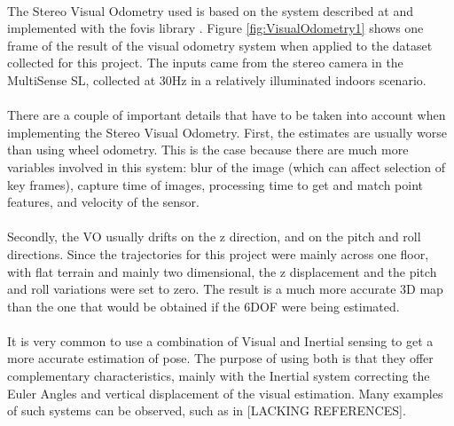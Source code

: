 \documentclass[12pt]{article}
\begin{document}
	\paragraph{}
	The Stereo Visual Odometry used is based on the system described at \cite{VisualOdometry} and implemented with the fovis library \cite{fovis}. Figure \ref{fig:VisualOdometry1} shows one frame of the result of the visual odometry system when applied to the dataset collected for this project. The inputs came from the stereo camera in the MultiSense SL, collected at 30Hz in a relatively illuminated indoors scenario.
	
	\paragraph{}
	There are a couple of important details that have to be taken into account when implementing the Stereo Visual Odometry. First, the estimates are usually worse than using wheel odometry. This is the case because there are much more variables involved in this system: blur of the image (which can affect selection of key frames), capture time of images, processing time to get and match point features, and velocity of the sensor. 
	
	\paragraph{}
	Secondly, the VO usually drifts on the z direction, and on the pitch and roll directions. Since the trajectories for this project were mainly across one floor, with flat terrain and mainly two dimensional, the z displacement and the pitch and roll variations were set to zero. The result is a much more accurate 3D map than the one that would be obtained if the 6DOF were being estimated.
	
	\paragraph{}
	It is very common to use a combination of Visual and Inertial sensing to get a more accurate estimation of pose. The purpose of using both is that they offer complementary characteristics, mainly with the Inertial system correcting the Euler Angles and vertical displacement of the visual estimation. Many examples of such systems can be observed, such as in [LACKING REFERENCES].
	
\end{document}
